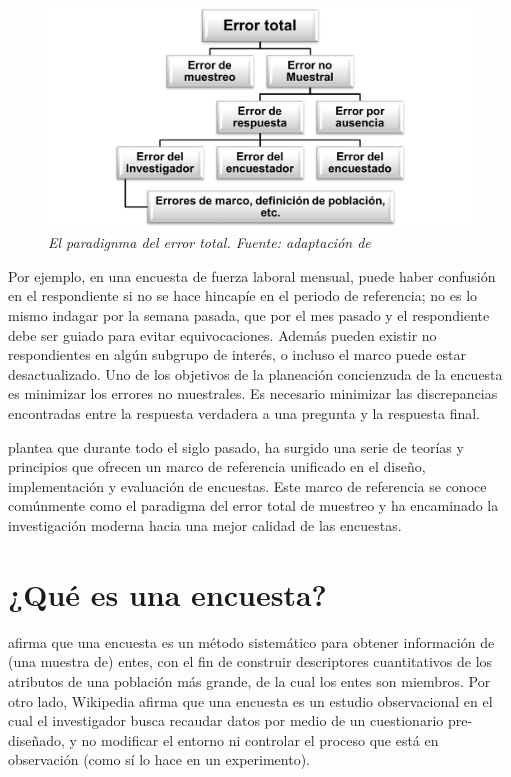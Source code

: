 \documentclass[
  12pt,
  spanish,
]{book}
\begin{document}
\begin{figure}
\centering
\includegraphics{Pics/Picture9.png}
\caption{\emph{El paradignma del error total. Fuente: adaptación de \citet{Groves_Fowler_Couper_Lepkowski_Singer_Tourangeau_2009}}}
\end{figure}

Por ejemplo, en una encuesta de fuerza laboral mensual, puede haber confusión en el respondiente si no se hace hincapíe en el periodo de referencia; no es lo mismo indagar por la semana pasada, que por el mes pasado y el respondiente debe ser guiado para evitar equivocaciones. Además pueden existir no respondientes en algún subgrupo de interés, o incluso el marco puede estar desactualizado. Uno de los objetivos de la planeación concienzuda de la encuesta es minimizar los errores no muestrales. Es necesario minimizar las discrepancias encontradas entre la respuesta verdadera a una pregunta y la respuesta final.

\citet{Groves_Fowler_Couper_Lepkowski_Singer_Tourangeau_2009} plantea que durante todo el siglo pasado, ha surgido una serie de teorías y principios que ofrecen un marco de referencia unificado en el diseño, implementación y evaluación de encuestas. Este marco de referencia se conoce comúnmente como el paradigma del error total de muestreo y ha encaminado la investigación moderna hacia una mejor calidad de las encuestas.

\hypertarget{quuxe9-es-una-encuesta}{%
\section{¿Qué es una encuesta?}\label{quuxe9-es-una-encuesta}}

\citet{Groves_Fowler_Couper_Lepkowski_Singer_Tourangeau_2009} afirma que una encuesta es un método sistemático para obtener información de (una muestra de) entes, con el fin de construir descriptores cuantitativos de los atributos de una población más grande, de la cual los entes son miembros.
Por otro lado, Wikipedia afirma que una encuesta es un estudio observacional en el cual el investigador busca recaudar datos por medio de un cuestionario pre-diseñado, y no modificar el entorno ni controlar el proceso que está en observación (como sí lo hace en un experimento).
\end{document}
